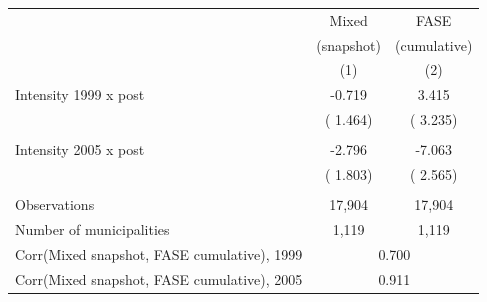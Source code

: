 \begin{tabular}{lcc} \hline \hline
& \multicolumn{1}{c}{Mixed} & \multicolumn{1}{c}{FASE} \\ 
& \multicolumn{1}{c}{(snapshot)} & \multicolumn{1}{c}{(cumulative)} \\ 
& \multicolumn{1}{c}{(1)} & \multicolumn{1}{c}{(2)} \\ \toprule
Intensity 1999 x post &       -0.719 &        3.415 \\ 
 & (       1.464) & (       3.235) \\ 
  & & \\ 
Intensity 2005 x post &       -2.796 &       -7.063 \\ 
 & (       1.803) & (       2.565) \\ 
  & & \\ 
Observations &       17,904 &       17,904 \\ 
Number of municipalities &        1,119 &        1,119 \\ 
\bottomrule
Corr(Mixed snapshot, FASE cumulative), 1999 & \multicolumn{2}{c}{0.700} \\ 
Corr(Mixed snapshot, FASE cumulative), 2005 & \multicolumn{2}{c}{0.911} \\ 
\end{tabular}